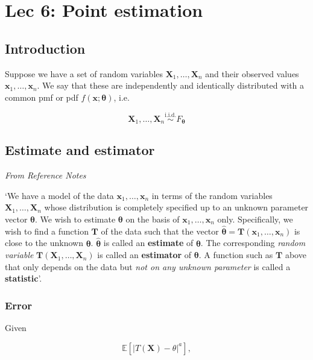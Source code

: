 \chapter[Lec 6: Point estimation]{Lec 6: Point estimation}


\section{Introduction}\label{sec:6intro}

Suppose we have a set of random variables \(\bm{X}_1, \ldots, \bm{X}_n\) and 
their observed values \(\bm{x}_1, \ldots, \bm{x}_n\). We say that these are 
independently and identically distributed with a common pmf or pdf \(f(\bm{x};\bm{\theta})\), 
i.e. 

\[\bm{X}_1, \ldots, \bm{X}_n \overset{\text{i.i.d.}}{\sim} F_{\bm{\theta}}\]

\section{Estimate and estimator}\label{sec:estimate and estimator}

\textit{From Reference Notes}

`We have a model of the data \(\bm{x}_1, \ldots, \bm{x}_n\) in terms of the random variables \(\bm{X}_1, \ldots, \bm{X}_n\) whose distribution is completely specified up to an unknown parameter vector \(\bm{\theta}\). 
We wish to estimate \(\bm{\theta}\) on the basis of \(\bm{x}_1, \ldots, \bm{x}_n\) only. 
Specifically, we wish to find a function \(\bm{T}\) of the data such that the vector \(\hat{\bm{\theta}} = \bm{T}(\bm{x}_1, \ldots, \bm{x}_n)\) is close to the unknown \(\bm{\theta}\). 
\(\hat{\bm{\theta}}\) is called an \textbf{estimate} of \(\bm{\theta}\). 
The corresponding \textit{random variable} \(\bm{T}(\bm{X}_1, \ldots, \bm{X}_n)\) is called an \textbf{estimator} of \(\bm{\theta}\). 
A function such as \(\bm{T}\) above that only depends on the data but \textit{not on any unknown parameter} is called a \textbf{statistic}'.\autocite{reference}

\subsection{Error}

Given

\begin{equation}\label{eq:error}
    \mathbb{E}\left[\left|T(\bm{X}) − \theta \right|^a\right],
\end{equation}

